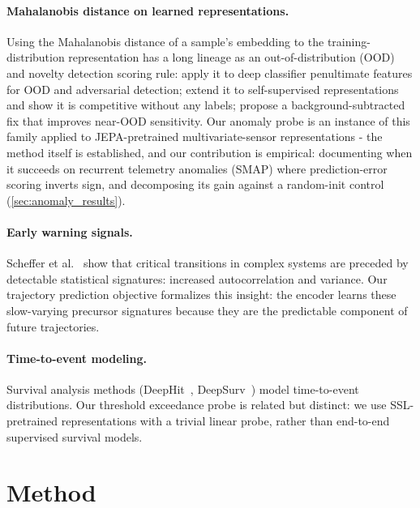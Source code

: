 \documentclass{article}
\begin{document}
\paragraph{Mahalanobis distance on learned representations.}
Using the Mahalanobis distance of a sample's embedding to the training-distribution representation has a long lineage as an out-of-distribution (OOD) and novelty detection scoring rule: \citet{lee2018mahalanobis} apply it to deep classifier penultimate features for OOD and adversarial detection; \citet{sehwag2021ssd} extend it to self-supervised representations and show it is competitive without any labels; \citet{ren2021simple} propose a background-subtracted fix that improves near-OOD sensitivity. Our anomaly probe is an instance of this family applied to JEPA-pretrained multivariate-sensor representations - the method itself is established, and our contribution is empirical: documenting when it succeeds on recurrent telemetry anomalies (SMAP) where prediction-error scoring inverts sign, and decomposing its gain against a random-init control (\cref{sec:anomaly_results}).

\paragraph{Early warning signals.}
Scheffer et al.~\citep{scheffer2009earlywarning} show that critical transitions in complex systems are preceded by detectable statistical signatures: increased autocorrelation and variance. Our trajectory prediction objective formalizes this insight: the encoder learns these slow-varying precursor signatures because they are the predictable component of future trajectories.

\paragraph{Time-to-event modeling.}
Survival analysis methods (DeepHit~\citep{lee2018deephit}, DeepSurv~\citep{katzman2018deepsurv}) model time-to-event distributions. Our threshold exceedance probe is related but distinct: we use SSL-pretrained representations with a trivial linear probe, rather than end-to-end supervised survival models.

\section{Method}
\label{sec:method}
\end{document}
